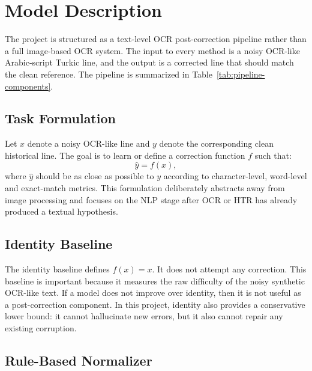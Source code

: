 \documentclass{article}
\begin{document}
\clearpage

\section{Model Description}
\label{sec:model}

The project is structured as a text-level OCR post-correction pipeline rather than a full image-based OCR system. The input to every method is a noisy OCR-like Arabic-script Turkic line, and the output is a corrected line that should match the clean reference. The pipeline is summarized in Table~\ref{tab:pipeline-components}.

\begin{table}[tbh!]
\begin{center}
\small

\caption{Main components of the proposed OCR post-correction pipeline.}
\label{tab:pipeline-components}
\end{center}
\end{table}

\subsection{Task Formulation}

Let $x$ denote a noisy OCR-like line and $y$ denote the corresponding clean historical line. The goal is to learn or define a correction function $f$ such that:
\[
    \hat{y} = f(x),
\]
where $\hat{y}$ should be as close as possible to $y$ according to character-level, word-level and exact-match metrics. This formulation deliberately abstracts away from image processing and focuses on the NLP stage after OCR or HTR has already produced a textual hypothesis.

\subsection{Identity Baseline}

The identity baseline defines $f(x)=x$. It does not attempt any correction. This baseline is important because it measures the raw difficulty of the noisy synthetic OCR-like text. If a model does not improve over identity, then it is not useful as a post-correction component. In this project, identity also provides a conservative lower bound: it cannot hallucinate new errors, but it also cannot repair any existing corruption.

\subsection{Rule-Based Normalizer}
\end{document}
